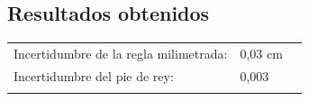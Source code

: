 \documentclass[10pt]{article}
\begin{document}
\subsection{Resultados obtenidos}

\begin{table}[H]
\begin{tabular}{lll}
\cline{1-2}
\multicolumn{1}{|l|}{Incertidumbre de la regla milimetrada:} & \multicolumn{1}{l|}{0,03 cm} &  \\ \cline{1-2}
\multicolumn{1}{|l|}{Incertidumbre del pie de rey:}          & \multicolumn{1}{l|}{0,003}   &  \\ \cline{1-2}
                                                             &                              & 
\end{tabular}
\end{table}
\end{document}
